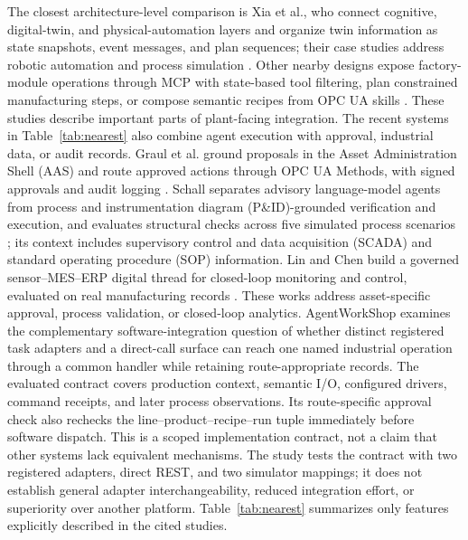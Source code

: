The closest architecture-level comparison is Xia et al., who connect cognitive,
digital-twin, and physical-automation layers and organize twin information as
state snapshots, event messages, and plan sequences; their case studies
address robotic automation and process simulation
\cite{xia2025architecture}. Other nearby designs expose factory-module
operations through MCP with state-based tool filtering, plan constrained
manufacturing steps, or compose semantic recipes from OPC UA skills
\cite{koehle2026llmdriven,silva2025mcpmanufacturing,koehle2025semanticrecipes}.
These studies describe important parts of plant-facing integration. The
recent systems in Table~\ref{tab:nearest} also combine agent execution with
approval, industrial data, or audit records. Graul et al. ground proposals in
the Asset Administration Shell (AAS) and route approved actions through OPC UA
Methods, with signed approvals and audit logging
\cite{graul2026aas}. Schall separates advisory language-model agents from
process and instrumentation diagram (P\&ID)-grounded verification and
execution, and evaluates structural checks across five simulated process
scenarios \cite{schall2026safe}; its context includes supervisory control and
data acquisition (SCADA) and standard operating procedure (SOP) information.
Lin and Chen build a governed sensor--MES--ERP digital thread for closed-loop
monitoring and control, evaluated on real manufacturing
records \cite{lin2026agentic}. These works address asset-specific approval,
process validation, or closed-loop analytics. AgentWorkShop examines the
complementary software-integration question of whether distinct registered
task adapters and a direct-call surface can reach one named industrial
operation through a common handler while retaining route-appropriate records.
The evaluated contract covers production context, semantic I/O, configured
drivers, command receipts, and later process observations. Its route-specific
approval check also rechecks the line--product--recipe--run tuple immediately
before software dispatch. This is a scoped implementation contract, not a
claim that other systems lack equivalent mechanisms. The study tests the
contract with two registered adapters, direct REST, and two simulator
mappings; it does not establish general adapter interchangeability, reduced
integration effort, or superiority over another platform.
Table~\ref{tab:nearest} summarizes only
features explicitly described in the cited studies.
